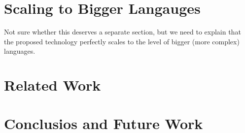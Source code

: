 \documentclass[sigplan,anonymous,review]{acmart}
\begin{document}






\section{Scaling to Bigger Langauges}
Not sure whether this deserves a separate section, but we need to explain
that the proposed technology perfectly scales to the level of bigger (more complex)
languages.


\section{Related Work}

\section{Conclusios and Future Work}


\end{document}
